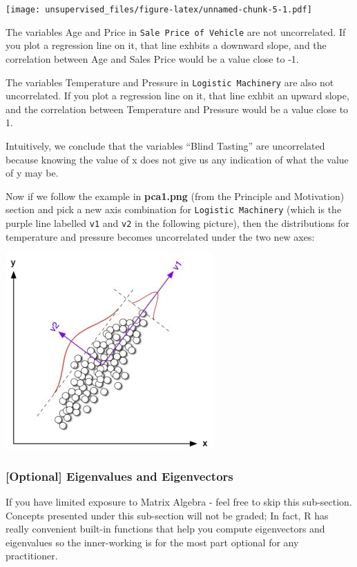 \documentclass[]{article}
\begin{document}
\texttt{[image: unsupervised\_files/figure-latex/unnamed-chunk-5-1.pdf]}

The variables Age and Price in \texttt{Sale\ Price\ of\ Vehicle} are not
uncorrelated. If you plot a regression line on it, that line exhbits a
downward slope, and the correlation between Age and Sales Price would be
a value close to -1.

The variables Temperature and Pressure in \texttt{Logistic\ Machinery}
are also not uncorrelated. If you plot a regression line on it, that
line exhbit an upward slope, and the correlation between Temperature and
Pressure would be a value close to 1.

Intuitively, we conclude that the variables ``Blind Tasting'' are
uncorrelated because knowing the value of x does not give us any
indication of what the value of y may be.

Now if we follow the example in \textbf{pca1.png} (from the Principle
and Motivation) section and pick a new axis combination for
\texttt{Logistic\ Machinery} (which is the purple line labelled
\texttt{v1} and \texttt{v2} in the following picture), then the
distributions for temperature and pressure becomes uncorrelated under
the two new axes:

\includegraphics{assets/pca2.jpg}

\hypertarget{optional-eigenvalues-and-eigenvectors}{%
\subsubsection{{[}Optional{]} Eigenvalues and
Eigenvectors}\label{optional-eigenvalues-and-eigenvectors}}

If you have limited exposure to Matrix Algebra - feel free to skip this
sub-section. Concepts presented under this sub-section will not be
graded; In fact, R has really convenient built-in functions that help
you compute eigenvectors and eigenvalues so the inner-working is for the
most part optional for any practitioner.
\end{document}
